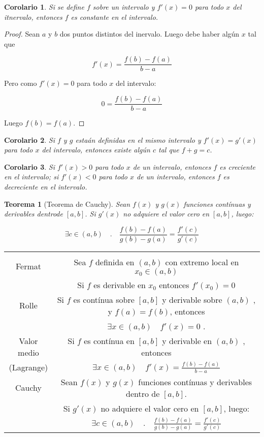 \documentclass[12pt,a4paper]{extarticle}
\newtheorem{theorem}{Teorema}[section]
\newtheorem{corol}{Corolario}[theorem]
\begin{document}
\begin{corol}
Si se define \(f\) sobre un intervalo y \(f'(x)=0\) para todo \(x\)
del itnervalo, entonces \(f\) es constante en el intervalo.
\end{corol}
\begin{proof}
Sean \(a\) y \(b\) dos puntos distintos del inervalo. Luego debe haber alg\'un
\(x\) tal que

\[f'(x)=\frac{f(b)-f(a)}{b-a}\]

Pero como \(f'(x)=0\) para todo \(x\) del intervalo:

\[0=\frac{f(b)-f(a)}{b-a}\]

Luego \(f(b) = f(a) \).

\end{proof}
\begin{corol}
Si \(f\) y \(g\) esta\'an definidas en el mismo intervalo y \(f'(x) = g'(x)\)
para todo \(x\) del intervalo, entonces existe alg\'un \(c\) tal que \(f + g =
c \).
\end{corol}

\begin{corol}
Si \(f'(x) > 0\) para todo \(x\) de un intervalo, entonces \(f\) es
creciente en el intervalo; si \(f'(x) < 0\) para todo \(x\) de un intervalo, entonces \(f\) es
decreciente en el intervalo.
\end{corol}
\begin{theorem}[Teorema de Cauchy]
Sean \(f(x)\) y \(g(x)\) funciones cont\'inuas y derivables dentrode
\([a,b]\). Si \(g'(x)\) no adquiere el valor cero en \([a,b]\), luego:

\[ \exists c \in (a,b) \quad . \quad \frac{f(b)-f(a)}{g(b)-g(a)} = \frac{f'(c)}{g'(c)} \]
\end{theorem}


\begin{tabular}{|c|c|}
  \hline
  & \\
  Fermat & Sea \(f\) definida en \((a,b)\) con extremo local en \(x_0
           \in (a,b)\)\\[0.5em]
  & Si \(f\) es derivable en \(x_0\) entonces \(f'(x_0) = 0\)\\[2.5em]
  Rolle &
          Si \( f \) es cont\'inua sobre \( [a,b] \) y derivable sobre
          \( (a,b) \) , y \( f(a) = f(b) \), entonces  \\[0.5em]
        & \(\exists  x \in (a,b) \quad f'(x)=0 \) . \\[2.5em]

  Valor medio &
                Si \( f \) es cont\'inua en \( [a,b] \) y derivable en
                \( (a,b) \) , entonces\\[0.5em]
  (Lagrange) & \(\exists  x \in (a,b) \quad f'(x)=\frac{f(b)-f(a)}{b-a} \) \\[2.5em]
  Cauchy
        & Sean \(f(x)\) y \(g(x)\) funciones cont\'inuas y derivables
          dentro de \([a,b]\).\\[0.5em]
 &  Si \(g'(x)\) no adquiere el valor cero en \([a,b]\), luego:\\[0.5em]
 & \( \exists c \in (a,b) \quad . \quad \frac{f(b)-f(a)}{g(b)-g(a)} = \frac{f'(c)}{g'(c)} \) \\[1em]
\hline
\end{tabular}
\end{document}
